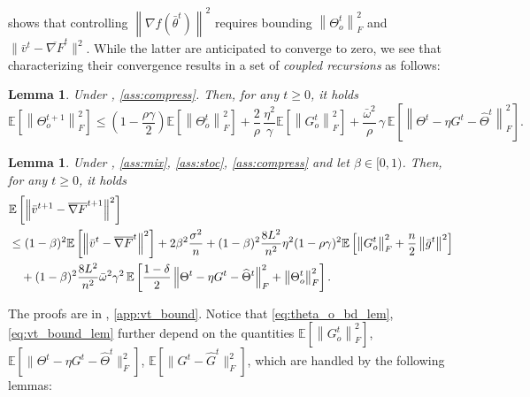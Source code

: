 \documentclass[10pt]{article} %
\theoremstyle{plain}
\newtheorem{lemma}[theorem]{Lemma}
\theoremstyle{definition}
\theoremstyle{remark}
\newcommand{\prm}{\theta}
\newcommand{\bw}{\bar{\omega}}
\newcommand{\avgg}{\bar{g}}
\newcommand{\avgtheta}{\bar{\prm}}
\newcommand{\norm}[1]{\left\| #1 \right\|}
\newcommand{\avggrdF}{\overline{\nabla F}}
\newcommand{\hatTheta}{\widehat{\Theta}}
\newcommand{\hatG}{\widehat{G}}
\newcommand{\avgv}{\bar{v}}
\begin{document}
 shows that controlling $\norm{ \nabla f( \avgtheta^t ) }^2$ requires bounding $\norm{ \Theta_o^t }_F^2$ and $\|\avgv^t - \avggrdF^t \|^2$. While the latter are anticipated to converge to zero, we see that characterizing their convergence results in a set of \emph{coupled recursions} as follows:
\begin{lemma} \label{lem:theta_o_new} Under , \ref{ass:compress}. Then, for any $t \geq 0$, it holds  \vspace{-.1cm}
    \begin{equation} \label{eq:theta_o_bd_lem}
    \mathbb{E} [\norm{\Theta_o^{t+1}}_F^2]  \leq (1-\frac{\rho\gamma}{2}) \mathbb{E} [\norm{\Theta_o^t}_F^2] + \frac{2}{\rho} \, \frac{\eta^2}{\gamma} \mathbb{E} [ \norm{G_o^t}_F^2 ] + \frac{\bw^2}{\rho} \, \gamma \, \mathbb{E} \left[ \norm{\Theta^t - \eta G^t - \hatTheta^t}^2_F \right]. 
    \end{equation}
\end{lemma}
\begin{lemma} \label{lem:vt_bound} Under , \ref{ass:mix}, \ref{ass:stoc}, \ref{ass:compress} and let $\beta \in [0,1)$. Then, for any $t \geq 0$, it holds \vspace{-.1cm}
    \begin{align}
        & \mathbb{E} \left[ \norm{ \avgv^{t+1} - \avggrdF^{t+1} }^2 \right] \label{eq:vt_bound_lem} \\
        & \leq (1-\beta)^2 \mathbb{E} \left[ \norm{ \avgv^{t} - \avggrdF^{t} }^2 \right] + 2 \beta^2 \frac{\sigma^2}{n} + (1-\beta)^2 \frac{8 L^2}{n^2} \eta^2 (1-\rho \gamma)^2 \mathbb{E} \left[ \norm{G_o^t}_F^2 + \frac{n}{2} \norm{ \avgg^t }^2 \right] \notag \\
        &\quad + (1-\beta)^2 \frac{8 L^2}{n^2} \bw^2 \gamma^2 \, \mathbb{E} \left[ \frac{1-\delta}{2} \norm{\Theta^t - \eta G^t - \hatTheta^t}_F^2 + \norm{\Theta_o^t}_F^2 \right]. \notag
    \end{align}
\end{lemma}
 \vspace{-.2cm}
The proofs are in , \ref{app:vt_bound}. 
Notice that \eqref{eq:theta_o_bd_lem}, \eqref{eq:vt_bound_lem} further depend on the quantities $\mathbb{E}[ \norm{G_o^t}_F^2]$, $\mathbb{E} [ \| \Theta^t - \eta G^t - \hatTheta^t \|_F^2]$, $\mathbb{E} [ \| G^t - \hatG^t \|_F^2 ]$, which are handled by the following lemmas:
\end{document}
